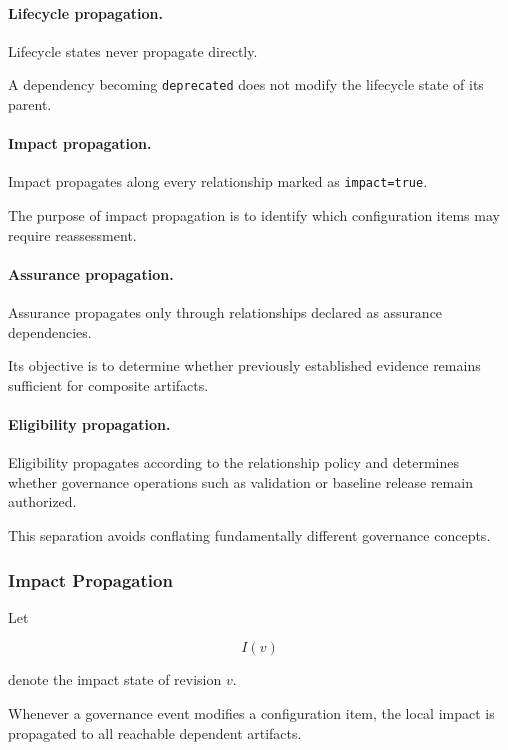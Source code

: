 \documentclass[10pt]{article}
\begin{document}
\paragraph{Lifecycle propagation.}

Lifecycle states never propagate directly.

A dependency becoming
\texttt{deprecated}
does not modify the lifecycle state of its parent.

\paragraph{Impact propagation.}

Impact propagates along every relationship marked as
\texttt{impact=true}.

The purpose of impact propagation is to identify which configuration items may
require reassessment.

\paragraph{Assurance propagation.}

Assurance propagates only through relationships declared as assurance
dependencies.

Its objective is to determine whether previously established evidence remains
sufficient for composite artifacts.

\paragraph{Eligibility propagation.}

Eligibility propagates according to the relationship policy and determines
whether governance operations such as validation or baseline release remain
authorized.

This separation avoids conflating fundamentally different governance concepts.

\subsubsection{Impact Propagation}

Let

\[
I(v)
\]

denote the impact state of revision
$v$.

Whenever a governance event modifies a configuration item, the local impact is
propagated to all reachable dependent artifacts.
\end{document}
